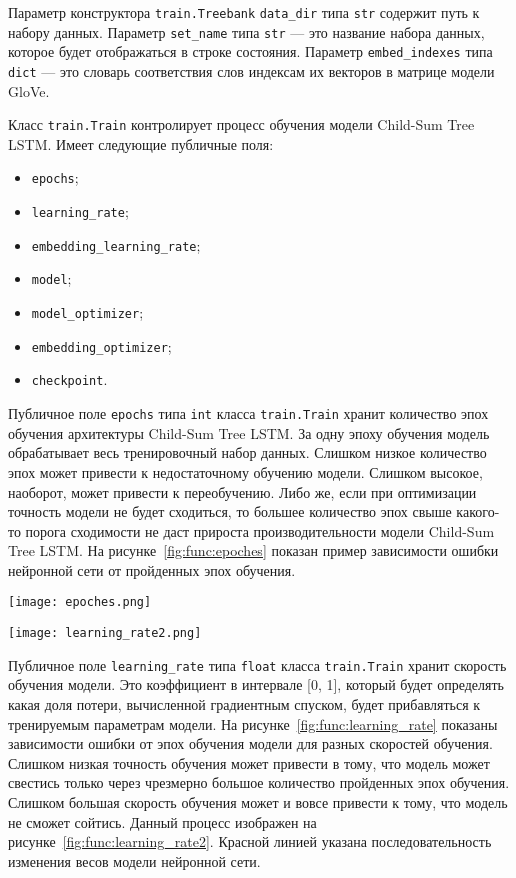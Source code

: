 Параметр конструктора \texttt{train.Treebank} \texttt{data\_dir} типа \texttt{str} содержит путь к набору данных. Параметр \texttt{set\_name} типа \texttt{str} --- это название набора данных, которое будет отображаться в строке состояния. Параметр \texttt{embed\_indexes} типа \texttt{dict} --- это словарь соответствия слов индексам их векторов в матрице модели GloVe.

Класс \texttt{train.Train} контролирует процесс обучения модели Child-Sum Tree LSTM\@. Имеет следующие публичные поля:
\begin{itemize}
\item \texttt{epochs};
\item \texttt{learning\_rate};
\item \texttt{embedding\_learning\_rate};
\item \texttt{model};
\item \texttt{model\_optimizer};
\item \texttt{embedding\_optimizer};
\item \texttt{checkpoint}.
\end{itemize}

Публичное поле \texttt{epochs} типа \texttt{int} класса \texttt{train.Train} хранит количество эпох обучения архитектуры Child-Sum Tree LSTM\@. За одну эпоху обучения модель обрабатывает весь тренировочный набор данных. Слишком низкое количество эпох может привести к недостаточному обучению модели. Слишком высокое, наоборот, может привести к переобучению. Либо же, если при оптимизации точность модели не будет сходиться, то большее количество эпох свыше какого-то порога сходимости не даст прироста производительности модели Child-Sum Tree LSTM\@. На рисунке~\ref{fig:func:epoches} показан пример зависимости ошибки нейронной сети от пройденных эпох обучения.

\begin{center}
  \texttt{[image: epoches.png]}
  \label{fig:func:epoches}
\end{center}

\begin{center}
  \texttt{[image: learning\_rate2.png]}
  \label{fig:func:learning_rate2}
\end{center}

Публичное поле \texttt{learning\_rate} типа \texttt{float} класса \texttt{train.Train} хранит скорость обучения модели. Это коэффициент в интервале [0, 1], который будет определять какая доля потери, вычисленной градиентным спуском, будет прибавляться к тренируемым параметрам модели. На рисунке~\ref{fig:func:learning_rate} показаны зависимости ошибки от эпох обучения модели для разных скоростей обучения. Слишком низкая точность обучения может привести в тому, что модель может свестись только через чрезмерно большое количество пройденных эпох обучения. Слишком большая скорость обучения может и вовсе привести к тому, что модель не сможет сойтись. Данный процесс изображен на рисунке~\ref{fig:func:learning_rate2}. Красной линией указана последовательность изменения весов модели нейронной сети.

